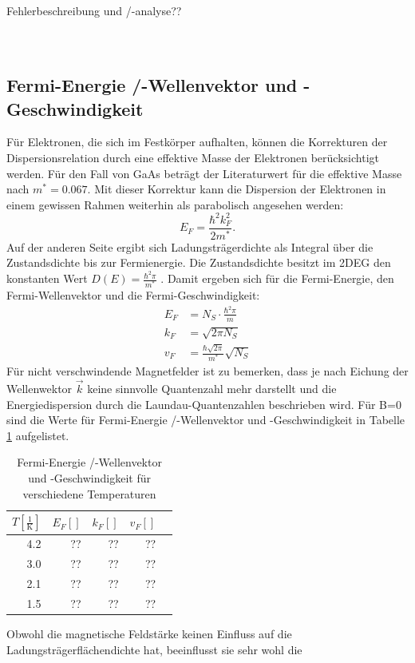 \documentclass[paper=a4,fontsize=10pt,DIV=18,twocolumn,parskip=half]{scrartcl}
\numberwithin{equation}{section}    %
\newcommand{\note}[1]{{\color{red}#1??}}
\begin{document}
\note{Fehlerbeschreibung und /-analyse}
%
%
~~~~~~~~~~~~~~~~~~~~~~~~~~~~~~~~~~~~~~~~~~~~~~~~~~~~~~~~~~~~~~~~~~~~~~~~~~~~~
\subsection{Fermi-Energie /-Wellenvektor und -Geschwindigkeit}
\label{a5}
Für Elektronen, die sich im Festkörper aufhalten, können die Korrekturen der Dispersionsrelation durch eine effektive Masse der Elektronen berücksichtigt werden. Für den Fall von GaAs beträgt der Literaturwert für die effektive Masse nach \cite{saarland} $m^*=0.067$. Mit dieser Korrektur kann die Dispersion der Elektronen in einem gewissen Rahmen weiterhin als parabolisch angesehen werden:
\begin{equation}
E_F=\frac{\hbar^2 k_F^2}{2 m^*}.
\end{equation}
Auf der anderen Seite ergibt sich Ladungsträgerdichte als Integral über die Zustandsdichte bis zur Fermienergie. Die Zustandsdichte besitzt im 2DEG den konstanten Wert $D(E)=\frac{\hbar^2 \pi}{m^*}$ \citep{anleitung}.
Damit ergeben sich für die Fermi-Energie, den Fermi-Wellenvektor und die Fermi-Geschwindigkeit:
\begin{align}
E_F&=N_S \cdot \frac{\hbar^2 \pi}{m}\\
k_F&=\sqrt{2 \pi N_S}\\
v_F&=\frac{\hbar\sqrt{2 \pi}}{m^*} \sqrt{N_S}
\end{align}
Für nicht verschwindende Magnetfelder ist zu bemerken, dass je nach Eichung der Wellenwektor $\vec{k}$ keine sinnvolle Quantenzahl mehr darstellt und die Energiedispersion durch die Laundau-Quantenzahlen beschrieben wird.
Für B=0 sind die Werte für Fermi-Energie /-Wellenvektor und -Geschwindigkeit in Tabelle \ref{fermitabelle} aufgelistet.

\begin{table}[htp]
	\begin{center}
		\begin{tabular}{rrrrr}
			\hline
			$T[\frac{1}{\mathrm{K}}]$ & $E_F[]$ & $k_F[]$ & $v_F[]$\\
			\hline
			4.2 &??&??&??\\
			3.0 &??&??&??\\
			2.1 &??&??&??\\
			1.5 &??&??&??\\
			\hline
		\end{tabular}
		\caption{Fermi-Energie /-Wellenvektor und -Geschwindigkeit für verschiedene Temperaturen}
		\label{fermitabelle}
	\end{center}
\end{table}
Obwohl die magnetische Feldstärke keinen Einfluss auf die Ladungsträgerflächendichte hat, beeinflusst sie sehr wohl die 
%
\end{document}

